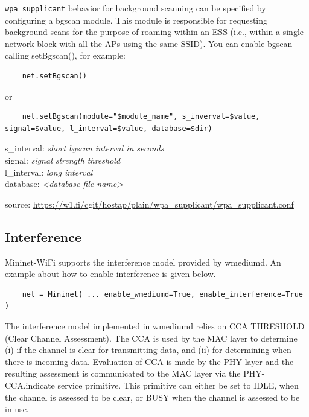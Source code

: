 \texttt{wpa\_supplicant} behavior for background scanning can be specified by configuring a bgscan module. This module is responsible for requesting background scans for the purpose of roaming within an ESS (i.e., within a single network block with all the APs using the same SSID). You can enable bgscan calling setBgscan(), for example:

\begin{verbatim}
    net.setBgscan()
\end{verbatim}
or
\begin{verbatim}
    net.setBgscan(module="$module_name", s_inverval=$value, signal=$value, l_interval=$value, database=$dir)
\end{verbatim}


\noindent s\_interval: \textit{short bgscan interval in seconds} \\
signal: \textit{signal strength threshold} \\
l\_interval: \textit{long interval} \\
database: \textit{<database file name>}

\noindent source: \url{https://w1.fi/cgit/hostap/plain/wpa_supplicant/wpa_supplicant.conf}

\subsection{Interference}
Mininet-WiFi supports the interference model provided by wmediumd. An example about how to enable interference is given below.

\begin{verbatim}
    net = Mininet( ... enable_wmediumd=True, enable_interference=True )
\end{verbatim}

The interference model implemented in wmediumd relies on CCA THRESHOLD (Clear Channel Assessment). The CCA is used by the MAC layer to determine (i) if the channel is clear for transmitting data, and (ii) for determining when there is incoming data. Evaluation of CCA is made by the PHY layer and the resulting assessment is communicated to the MAC layer via the PHY-CCA.indicate service primitive. This primitive can either be set to IDLE, when the channel is assessed to be clear, or BUSY when the channel is assessed to be in use.


